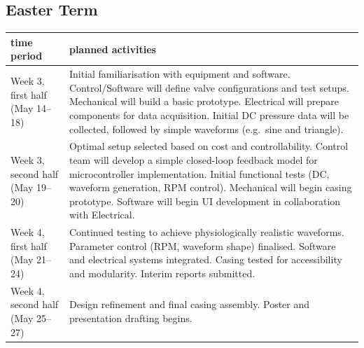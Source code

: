 \documentclass[10pt, a4paper]{article}
\begin{document}
\subsection{Easter Term}
\begin{table}[H]
    \small
    \centering
    \begin{tabularx}{\linewidth}{>{\raggedright\arraybackslash}p{4cm} X}
        \toprule
        \textbf{time period} & \textbf{planned activities}                                                                                                                                                                                                                                                                                                               \\
        \midrule

        Week 3, first half (May 14--18)
                             & Initial familiarisation with equipment and software. Control/Software will define valve configurations and test setups. Mechanical will build a basic prototype. Electrical will prepare components for data acquisition. Initial DC pressure data will be collected, followed by simple waveforms (e.g.\ sine and triangle).             \\

        Week 3, second half (May 19--20)
                             & Optimal setup selected based on cost and controllability. Control team will develop a simple closed-loop feedback model for microcontroller implementation. Initial functional tests (DC, waveform generation, RPM control). Mechanical will begin casing prototype. Software will begin UI development in collaboration with Electrical. \\

        Week 4, first half (May 21--24)
                             & Continued testing to achieve physiologically realistic waveforms. Parameter control (RPM, waveform shape) finalised. Software and electrical systems integrated. Casing tested for accessibility and modularity. Interim reports submitted.                                                                                               \\

        Week 4, second half (May 25--27)
                             & Design refinement and final casing assembly. Poster and presentation drafting begins.                                                                                                                                                                                                                                                     \\


\end{tabularx}
\end{table}
\end{document}
